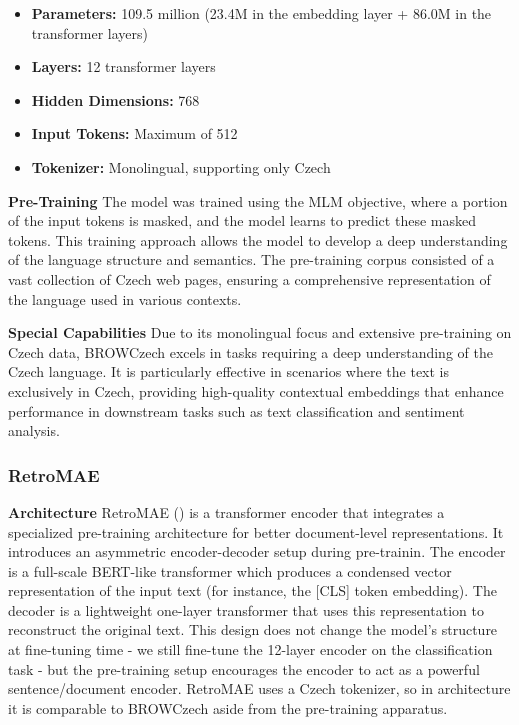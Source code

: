 \begin{itemize}
    \item \textbf{Parameters:} 109.5 million (23.4M in the embedding layer + 86.0M in the transformer layers)
    \item \textbf{Layers:} 12 transformer layers
    \item \textbf{Hidden Dimensions:} 768
    \item \textbf{Input Tokens:} Maximum of 512
    \item \textbf{Tokenizer:} Monolingual, supporting only Czech
\end{itemize}

\textbf{Pre-Training}
The model was trained using the \ac{MLM} objective, where a portion of the input tokens is masked, and the model learns to predict these masked tokens. This training approach allows the model to develop a deep understanding of the language structure and semantics. The pre-training corpus consisted of a vast collection of Czech web pages, ensuring a comprehensive representation of the language used in various contexts.

\textbf{Special Capabilities}
Due to its monolingual focus and extensive pre-training on Czech data, \ac{BROWCzech} excels in tasks requiring a deep understanding of the Czech language. It is particularly effective in scenarios where the text is exclusively in Czech, providing high-quality contextual embeddings that enhance performance in downstream tasks such as text classification and sentiment analysis.


\subsubsection{\ac{RetroMAE}}

\textbf{Architecture}
\ac{RetroMAE} (\cite{bednavr2024some}) is a transformer encoder that integrates a specialized pre-training architecture for better document-level representations. It introduces an asymmetric encoder-decoder setup during pre-trainin. The encoder is a full-scale \ac{BERT}-like transformer which produces a condensed vector representation of the input text (for instance, the [CLS] token embedding). The decoder is a lightweight one-layer transformer that uses this representation to reconstruct the original text. This design does not change the model's structure at fine-tuning time - we still fine-tune the 12-layer encoder on the classification task - but the pre-training setup encourages the encoder to act as a powerful sentence/document encoder. \ac{RetroMAE} uses a Czech tokenizer, so in architecture it is comparable to \ac{BROWCzech} aside from the pre-training apparatus.

